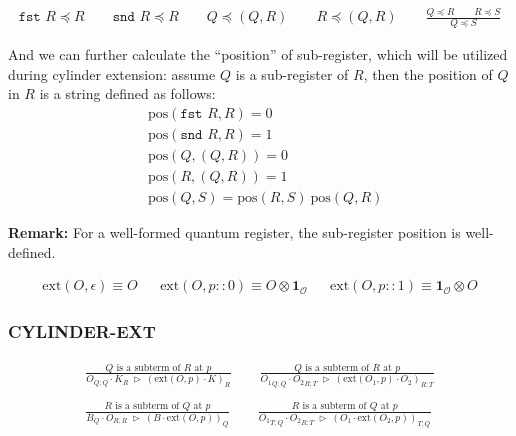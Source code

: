 \documentclass[manuscript, review, timestamp]{acmart}
\newcommand*{\fst}{\texttt{fst }}
\newcommand*{\snd}{\texttt{snd }}
\newcommand*{\reduce}{\ \triangleright\ }
\begin{document}
\begin{definition}
  \begin{gather*}
    \fst R \preceq R \qquad \snd R \preceq R \qquad Q \preceq (Q, R) \qquad R \preceq (Q, R)
    \qquad 
    \frac{Q \preceq R \qquad R \preceq S}{Q \preceq S}
  \end{gather*}

  And we can further calculate the ``position'' of sub-register, which will be utilized during cylinder extension: assume $Q$ is a sub-register of $R$, then the position of $Q$ in $R$ is a string defined as follows:
  \begin{align*}
    & \textrm{pos}(\fst R, R) = 0 \\
    & \textrm{pos}(\snd R, R) = 1 \\
    & \textrm{pos}(Q, (Q, R)) = 0 \\
    & \textrm{pos}(R, (Q, R)) = 1 \\
    & \textrm{pos}(Q, S) = \textrm{pos}(R, S)\ \textrm{pos}(Q, R)
  \end{align*}
\end{definition}

\textbf{Remark:} For a well-formed quantum register, the sub-register position is well-defined.

\begin{definition}
  \begin{align*}
    \textrm{ext}(O, \epsilon) \equiv O
    && \textrm{ext}(O, p::0) \equiv O \otimes \mathbf{1}_\mathcal{O}
    && \textrm{ext}(O, p::1) \equiv \mathbf{1}_\mathcal{O} \otimes O
  \end{align*}
\end{definition}

\subsubsection*{\textsf{CYLINDER-EXT}}
\begin{gather*}
  \frac{Q \textrm{ is a subterm of } R \textrm{ at } p}{O_{Q; Q} \cdot K_{R} \reduce (\textrm{ext}(O, p) \cdot K)_{R}}
  \qquad
  \frac{Q \textrm{ is a subterm of } R \textrm{ at } p}{{O_1}_{Q; Q} \cdot {O_2}_{R; T} \reduce (\textrm{ext}(O_1, p) \cdot O_2)_{R; T}} \\
  \\
  \frac{R \textrm{ is a subterm of } Q \textrm{ at } p}{B_{Q} \cdot O_{R; R} \reduce (B \cdot \textrm{ext}(O, p))_{Q}}
  \qquad
  \frac{R \textrm{ is a subterm of } Q \textrm{ at } p}{{O_1}_{T; Q} \cdot {O_2}_{R; T} \reduce (O_1 \cdot \textrm{ext}(O_2, p))_{T; Q}} \\
\end{gather*}
\end{document}
